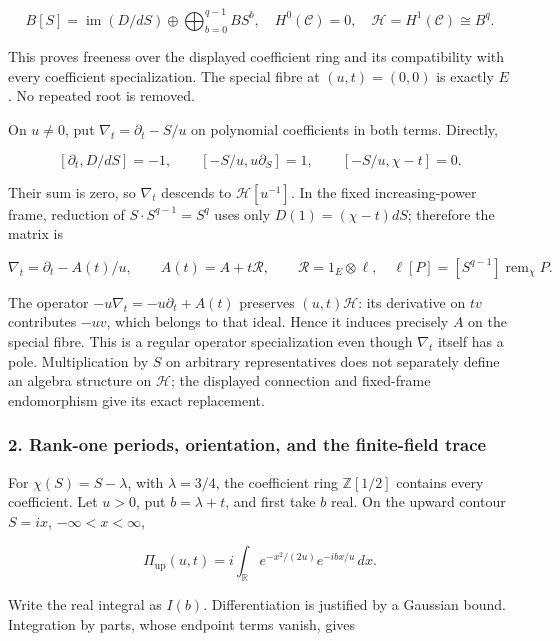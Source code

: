 \documentclass{article}
\begin{document}
\[
B[S]=\operatorname{im}(D/dS)\oplus
 \bigoplus_{b=0}^{q-1}B S^b,
\quad H^0(\mathcal C)=0,
\quad \mathcal H=H^1(\mathcal C)\cong B^q.
\tag{DP.3}
\]

This proves freeness over the displayed coefficient ring and its compatibility with every coefficient specialization. The special fibre at \((u,t)=(0,0)\) is exactly \(E\). No repeated root is removed.

On \(u\ne0\), put \(\nabla_t=\partial_t-S/u\) on polynomial coefficients in both terms. Directly,

\[
[\partial_t,D/dS]=-1,
\qquad [-S/u,u\partial_S]=1,
\qquad [-S/u,\chi-t]=0.
\]

Their sum is zero, so \(\nabla_t\) descends to \(\mathcal H[u^{-1}]\). In the fixed increasing-power frame, reduction of \(S\cdot S^{q-1}=S^q\) uses only \(D(1)=(\chi-t)dS\); therefore the matrix is

\[
\nabla_t=\partial_t-A(t)/u,
\qquad A(t)=A+t\mathcal R,
\qquad \mathcal R=1_E\otimes\ell,
\quad \ell[P]=[S^{q-1}]\operatorname{rem}_{\chi}P.
\tag{DP.4}
\]

The operator \(-u\nabla_t=-u\partial_t+A(t)\) preserves \((u,t)\mathcal H\): its derivative on \(tv\) contributes \(-uv\), which belongs to that ideal. Hence it induces precisely \(A\) on the special fibre. This is a regular operator specialization even though \(\nabla_t\) itself has a pole. Multiplication by \(S\) on arbitrary representatives does not separately define an algebra structure on \(\mathcal H\); the displayed connection and fixed-frame endomorphism give its exact replacement.

\subsubsection{2. Rank-one periods, orientation, and the finite-field trace}\label{endpoint-purity_review--rank-one-periods-orientation-and-the-finite-field-trace}

For \(\chi(S)=S-\lambda\), with \(\lambda=3/4\), the coefficient ring \(\mathbb Z[1/2]\) contains every coefficient. Let \(u>0\), put \(b=\lambda+t\), and first take \(b\) real. On the upward contour \(S=ix\), \(-\infty<x<\infty\),

\[
\Pi_{\mathrm{up}}(u,t)
=i\int_{\mathbb R}e^{-x^2/(2u)}e^{-ibx/u}\,dx.
\tag{DP.5}
\]

Write the real integral as \(I(b)\). Differentiation is justified by a Gaussian bound. Integration by parts, whose endpoint terms vanish, gives
\end{document}
